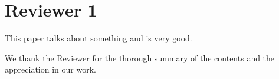%
%
\section*{Reviewer 1}
%
%
\begin{ReviewerComment}{1}
This paper talks about something and is very good.\end{ReviewerComment}
%
\begin{Answer}
We thank the Reviewer for the thorough summary of the contents and the appreciation in our work.
 \RevTaskDone
\end{Answer}
%
%
%
